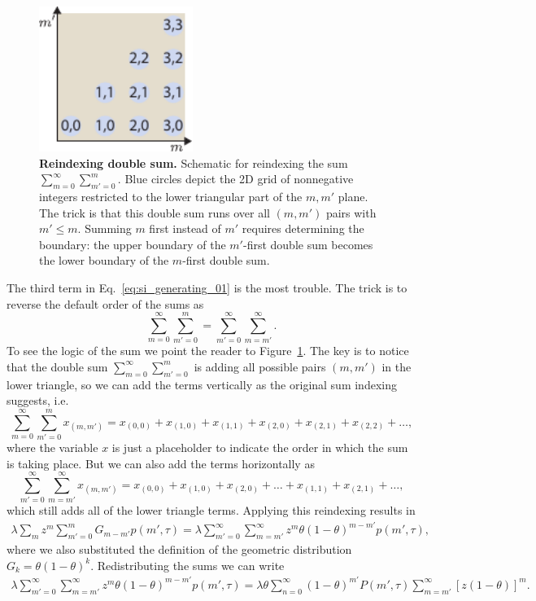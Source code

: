 \begin{figure}[h!]
\centering
\includegraphics[width=5cm]{../../figures/si/figS0X_reindex_sum.pdf}
\caption{\textbf{Reindexing double sum.} Schematic for reindexing the sum
$\sum_{m=0}^\infty \sum_{m'=0}^m$. Blue circles depict the 2D grid of
nonnegative integers restricted to the lower triangular part of the $m, m'$
plane. The trick is that this double sum runs over all $(m, m')$ pairs with
$m'\le m$. Summing $m$ first instead of $m'$ requires determining the
boundary: the upper boundary of the $m'$-first double sum becomes the
lower boundary of the $m$-first double sum.}
\label{figS2:sum_reindex}
\end{figure}

The third term in Eq.~\ref{eq:si_generating_01} is the most trouble. The trick
is to reverse the default order of the sums as
\begin{equation}
\sum_{m=0}^{\infty} \sum_{m'=0}^{m} = \sum_{m'=0}^{\infty} \sum_{m=m'}^{\infty}.
\end{equation}
To see the logic of the sum we point the reader to
Figure~\ref{figS2:sum_reindex}. The key is to notice that the double sum
$\sum_{m=0}^\infty \sum_{m'=0}^m$ is adding all possible pairs $(m, m')$ in the
lower triangle, so we can add the terms vertically as the original sum
indexing suggests, i.e.
\begin{equation}
\sum_{m=0}^{\infty} \sum_{m'=0}^{m} x_{(m, m')}= 
x_{(0, 0)} + x_{(1, 0)} + x_{(1, 1)} + x_{(2, 0)} + x_{(2, 1)} + x_{(2, 2)} + 
\ldots,
\end{equation}
where the variable $x$ is just a placeholder to indicate the order in which the
sum is taking place. But we can also add the terms horizontally as
\begin{equation}
\sum_{m'=0}^{\infty} \sum_{m=m'}^{\infty} x_{(m, m')} =
x_{(0, 0)} + x_{(1, 0)} + x_{(2, 0)} + \ldots + x_{(1,1)} + x_{(2, 1)} + \ldots,
\end{equation}
which still adds all of the lower triangle terms. Applying this reindexing
results in
\begin{align}
\lambda \sum_m z^m \sum_{m'=0}^m G_{m-m'} p(m', \tau) =
\lambda \sum_{m'=0}^{\infty} \sum_{m=m'}^{\infty} z^m 
\theta (1 - \theta)^{m-m'} p(m', \tau),
\end{align}
where we also substituted the definition of the geometric distribution $G_{k} =
\theta (1 - \theta)^k$. Redistributing the sums we can write
\begin{align}
\lambda \sum_{m'=0}^{\infty} \sum_{m=m'}^{\infty} z^m 
\theta (1 - \theta)^{m-m'} p(m', \tau) = 
\lambda \theta \sum_{n=0}^{\infty}(1-\theta)^{m'} P(m', \tau) 
\sum_{m=m'}^{\infty} \left[z (1-\theta)\right]^{m}.
\label{eq:si_generating_02}
\end{align}

